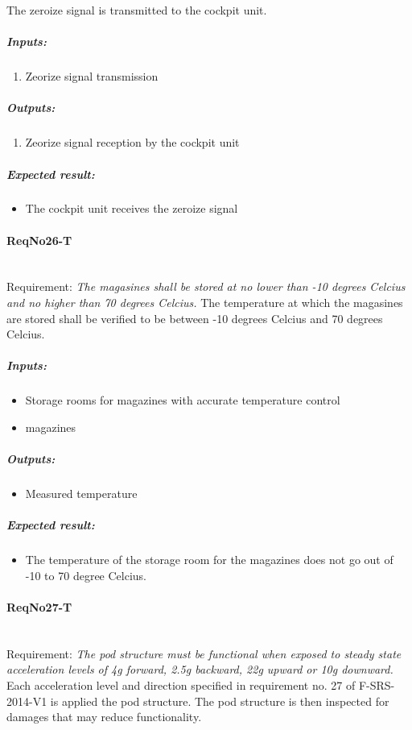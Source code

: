 The zeroize signal is transmitted to the cockpit unit. 
\subparagraph{Inputs:}
	\begin{enumerate}
	\item Zeorize signal transmission
	\end{enumerate}
\subparagraph{Outputs:}
	\begin{enumerate}
	\item Zeorize signal reception by the cockpit unit
	\end{enumerate}
\subparagraph{Expected result:}
	\begin{itemize}
	\item The cockpit unit receives the zeroize signal 
	\end{itemize}

\paragraph{ReqNo26-T}\mbox{}\\ %
Requirement: \textit{The magasines shall be stored at no lower than -10 degrees Celcius and no higher than 70 degrees Celcius.}
The temperature at which the magasines are stored shall be verified to be between -10 degrees Celcius and 70 degrees Celcius.
	\subparagraph{Inputs:}
	\begin{itemize}
	\item Storage rooms for magazines with accurate temperature control 
	\item magazines
	\end{itemize}
	\subparagraph{Outputs:}
	\begin{itemize}
	\item Measured temperature
	\end{itemize}
	\subparagraph{Expected result:}
	\begin{itemize}
	\item The temperature of the storage room for the magazines does not go out of -10 to 70 degree Celcius. 
	\end{itemize}
\paragraph{ReqNo27-T}\mbox{}\\ %
Requirement: \textit{The pod structure must be functional when exposed to steady state acceleration levels of 4g forward, 2.5g backward, 22g upward or 10g downward.}
\\
Each acceleration level and direction specified in requirement no. 27 of F-SRS-2014-V1 is applied the pod structure. The pod structure is then inspected for damages that may reduce functionality.

